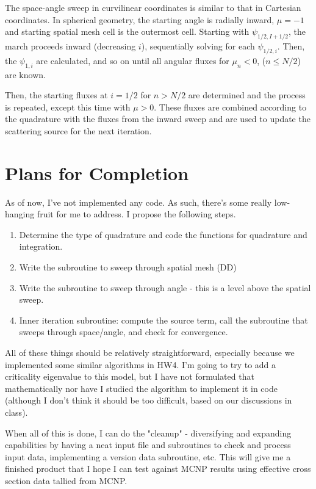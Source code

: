 \documentclass[11pt, oneside]{article}   	%
\begin{document}
The space-angle sweep in curvilinear coordinates is similar to that in Cartesian coordinates. In spherical geometry, the starting angle is radially inward, $\mu = -1$ and starting spatial mesh cell is the outermost cell. Starting with $\psi_{1/2, I+1/2}$, the march proceeds inward (decreasing $i$), sequentially solving for each $\psi_{1/2, i}$. Then, the $\psi_{1,i}$ are calculated, and so on until all angular fluxes for $\mu_n<0$, ($n \leq N/2$) are known.

Then, the starting fluxes at $i=1/2$ for $n > N/2$ are determined and the process is repeated, except this time with $\mu > 0$. These fluxes are combined according to the quadrature with the fluxes from the inward sweep and are used to update the scattering source for the next iteration.

\section{Plans for Completion}

As of now, I've not implemented any code. As such, there's some really low-hanging fruit for me to address. I propose the following steps.

\begin{enumerate}
\item Determine the type of quadrature and code the functions for quadrature and integration.
\item Write the subroutine to sweep through spatial mesh (DD)
\item Write the subroutine to sweep through angle - this is a level above the spatial sweep.
\item Inner iteration subroutine: compute the source term, call the subroutine that sweeps through space/angle, and check for convergence.
\end{enumerate}

All of these things should be relatively straightforward, especially because we implemented some similar algorithms in HW4. I'm going to try to add a criticality eigenvalue to this model, but I have not formulated that mathematically nor have I studied the algorithm to implement it in code (although I don't think it should be too difficult, based on our discussions in class).

When all of this is done, I can do the "cleanup" - diversifying and expanding capabilities by having a neat input file and subroutines to check and process input data, implementing a version data subroutine, etc. This will give me a finished product that I hope I can test against MCNP results using effective cross section data tallied from MCNP.
\end{document}
